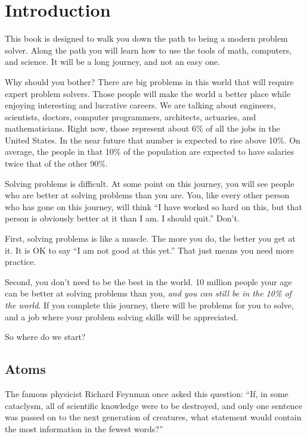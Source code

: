 \chapter{Introduction}

This book is designed to walk you down the path to being a modern
problem solver. Along the path you will learn how to use the tools of
math, computers, and science. It will be a long journey, and not an
easy one.

Why should you bother? There are big problems in this world that will
require expert problem solvers. Those people will make the world a
better place while enjoying interesting and lucrative careers. We are
talking about engineers, scientists, doctors, computer programmers,
architects, actuaries, and mathematicians. Right now, those represent
about 6\% of all the jobs in the United States. In the near future
that number is expected to rise above 10\%.  On average, the people in
that 10\% of the population are expected to have salaries twice that
of the other 90\%.

Solving problems is difficult. At some point on this journey, you will
see people who are better at solving problems than you are. You, like
every other person who has gone on this journey, will think ``I have
worked so hard on this, but that person is obviously better at it than
I am. I should quit.'' Don't.

First, solving problems is like a muscle. The more you do, the better
you get at it.  It is OK to say ``I am not good at this yet.'' That
just means you need more practice.

Second, you don't need to be the best in the world. 10 million people
your age can be better at solving problems than you, \textit{and you
  can still be in the 10\% of the world}. If you complete this
journey, there will be problems for you to solve, and a job where your
problem solving skills will be appreciated.

So where do we start?

\section{Atoms}

The famous physicist Richard Feynman once asked this question: ``If,
in some cataclysm, all of scientific knowledge were to be destroyed,
and only one sentence was passed on to the next generation of
creatures, what statement would contain the most information in the
fewest words?''

